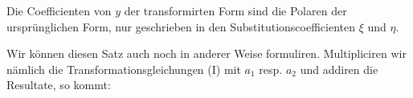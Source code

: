\glqq Die Coefficienten von $y$ der transformirten Form sind die Polaren der ursprünglichen Form, nur geschrieben in den Substitutionscoefficienten $\xi$ und $\eta$.\grqq{}

Wir können diesen Satz auch noch in anderer Weise formuliren. Multipliciren wir nämlich die Transformationsgleichungen (I) mit $a_1$ resp. $a_2$ und addiren die Resultate, so kommt:


